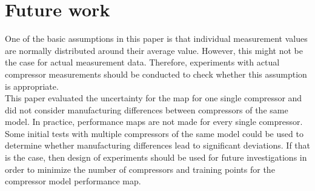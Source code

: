 \section{Future work}
\label{sec:future_work}
One of the basic assumptions in this paper is that individual measurement values are normally distributed around their average value. However, this might not be the case for actual measurement data. Therefore, experiments with actual compressor measurements should be conducted to check whether this assumption is appropriate.\\
This paper evaluated the uncertainty for the map for one single compressor and did not consider manufacturing differences between compressors of the same model. In practice, performance maps are not made for every single compressor.  Some initial tests with multiple compressors of the same model could be used to determine whether manufacturing differences lead to significant deviations. If that is the case, then design of experiments should be used for future investigations in order to minimize the number of compressors and training points for the compressor model performance map.
